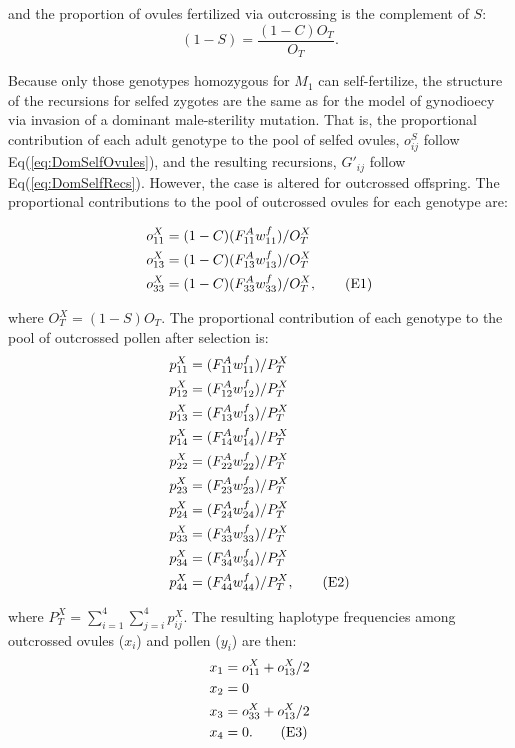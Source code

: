\documentclass{article}
\newcommand\numberthis{\addtocounter{equation}{1}\tag{\theequation}}
\begin{document}
\noindent and the proportion of ovules fertilized via outcrossing is the complement of $S$:
\begin{equation} 
(1 - S) = \frac{(1 - C)O_T}{O_T}.
\end{equation}

Because only those genotypes homozygous for $M_1$ can self-fertilize, the structure of the recursions for selfed zygotes are the same as for the model of gynodioecy via invasion of a dominant male-sterility mutation. That is, the proportional contribution of each adult genotype to the pool of selfed ovules, $o^S_{ij}$ follow Eq(\ref{eq:DomSelfOvules}), and the resulting recursions, $G'_{ij}$ follow Eq(\ref{eq:DomSelfRecs}). However, the case is altered for outcrossed offspring. The proportional contributions to the pool of outcrossed ovules for each genotype are:

\begin{align*}
    o^X_{11} &= (1 - C) (F^A_{11} w^f_{11})/O^X_T \\
    o^X_{13} &= (1 - C) (F^A_{13} w^f_{13})/O^X_T \\
    o^X_{33} &= (1 - C) (F^A_{33} w^f_{33})/O^X_T, \numberthis
\end{align*}

\noindent where $O^X_T = (1 - S)O_T$. The proportional contribution of each genotype to the pool of outcrossed pollen after selection is:
\begin{align*}
    p^X_{11} &= (F^A_{11} w^f_{11}) / P^X_T \\
    p^X_{12} &= (F^A_{12} w^f_{12}) / P^X_T \\
    p^X_{13} &= (F^A_{13} w^f_{13}) / P^X_T \\
    p^X_{14} &= (F^A_{14} w^f_{14}) / P^X_T \\
    p^X_{22} &= (F^A_{22} w^f_{22}) / P^X_T \\
    p^X_{23} &= (F^A_{23} w^f_{23}) / P^X_T \\
    p^X_{24} &= (F^A_{24} w^f_{24}) / P^X_T \\
    p^X_{33} &= (F^A_{33} w^f_{33}) / P^X_T \\
    p^X_{34} &= (F^A_{34} w^f_{34}) / P^X_T \\
    p^X_{44} &= (F^A_{44} w^f_{44}) / P^X_T, \numberthis
\end{align*}

\noindent where $P^X_T = \sum_{i=1}^{4}\sum_{j=i}^{4} p^X_{ij}$. The resulting haplotype frequencies among outcrossed ovules ($x_i$) and pollen ($y_i$) are then:
\begin{align*} 
    x_{1} &= o^X_{11} + o^X_{13}/2  \\
    x_{2} &= 0  \\
    x_{3} &= o^X_{33} + o^X_{13}/2  \\
    x_{4} &= 0.  \numberthis
\end{align*}
\end{document}
